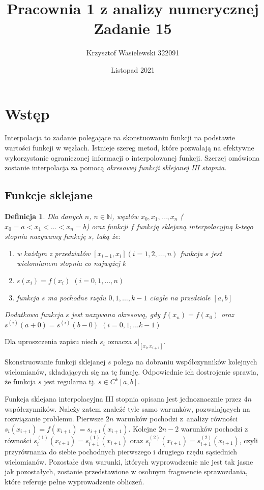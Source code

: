 \documentclass[11pt,wide]{article}
\title{\LARGE\textbf{Pracownia 1 z analizy numerycznej}\\Zadanie 15}
\author{Krzysztof Wasielewski 322091}
\date{Listopad 2021}
\newtheorem{definition}{Definicja}[section]
\begin{document}
\maketitle

\section{Wstęp}

Interpolacja to zadanie polegające na skonstuowaniu funkcji na podstawie wartości funkcji w węzłach. Istnieje szereg metod, które pozwalają na efektywne wykorzystanie ograniczonej informacji o interpolowanej funkcji. Szerzej omówiona zostanie interpolacja za pomocą \textit{okresowej funkcji sklejanej III stopnia}.

\subsection{Funkcje sklejane}
\theoremstyle{definition}

\begin{definition}
Dla danych $n$, $n\in\mathbb{N}$, węzłów $x_0, x_1, \dots, x_n$ ($x_0 = a < x_1 < \dots < x_n = b$) oraz funkcji $f$ funkcją sklejaną interpolacyjną k-tego stopnia nazywamy funkcję $s$, taką że:
\begin{enumerate}
    \item w każdym z przedziałów $[x_{i-1}, x_i](i = 1, 2,\dots, n)$ funkcja $s$ jest wielomianem stopnia co najwyżej $k$
    \item $s(x_i) = f(x_i)$ $(i = 0, 1,\dots, n)$
    \item funkcja $s$ ma pochodne rzędu $0, 1, \dots, k-1$ ciagłe na przedziale $[a, b]$
\end{enumerate}
Dodatkowo funkcja $s$ jest nazywana okresową, gdy $f(x_n) = f(x_0)$ oraz $s^{(i)}(a+0)=s^{(i)}(b-0)$ $(i = 0, 1, \dots k-1)$
\end{definition}
Dla uproszczenia zapisu niech $s_i$ oznacza $s\rvert_{[x_i, x_{i+1}]}$.

Skonstruowanie funkcji sklejanej $s$ polega na dobraniu współczynników kolejnych wielomianów, składających się na tę funcję. Odpowiednie ich dostrojenie sprawia, że funkcja $s$ jest regularna tj. $s \in C^k [a,b]$. 

Funkcja sklejana interpolacyjna III stopnia opisana jest jednoznacznie przez $4n$ współczynników. Należy zatem znaleźć tyle samo warunków, pozwalających na rozwiązanie problemu. Pierwsze $2n$ warunków pochodzi z~analizy równości $s_{i} (x_{i+1})= f(x_{i+1}) = s_{i+1} (x_{i+1})$. Kolejne $2n-2$ warunków pochodzi z równości $s_i^{(1)}(x_{i+1})=s_{i+1}^{(1)}(x_{i+1})$ oraz $s_i^{(2)}(x_{i+1})=s_{i+1}^{(2)}(x_{i+1})$, czyli przyrównania do siebie pochodnych pierwszego i drugiego rzędu sąsiednich wielomianów. Pozostałe dwa warunki, których wyprowadzenie nie jest tak jasne jak pozostałych, zostanie przedstawione w osobnym fragmencie sprawozdania, które referuje pełne wyprowadzenie obliczeń. 
\end{document}
